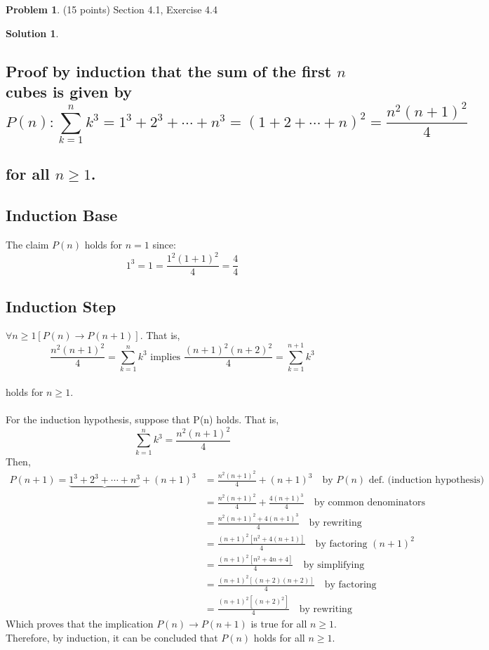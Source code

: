 \documentclass{article}
\theoremstyle{definition}
\newtheorem{problem}{Problem}
\newtheorem*{solution}{Solution}
\begin{document}
\newpage
\begin{problem} (15 points) Section 4.1, Exercise 4.4 
\end{problem}
\begin{solution}
\hspace{1cm}
\subsection*{Proof by induction that the sum of the first $n$ cubes is given by\\
$$P(n): \sum_{k=1}^{n} k^3 = 1^3 + 2^3 + \cdots + n^3 = (1+2+\cdots+n)^2 = \frac{n^2(n+1)^2}{4} $$\\ for all $n \geqslant 1$.}
\subsection*{Induction Base}
The claim $P(n)$ holds for $n = 1$ since:\\
$$1^3 = 1 = \frac{1^2(1+1)^2}{4} = \frac{4}{4}$$
\subsection*{Induction Step}
$\forall n \geqslant 1[P(n) \rightarrow P(n+1)]$. That is,\\
$$\frac{n^2(n+1)^2}{4} = \sum_{k=1}^{n} k^3 \mbox{ implies } \frac{(n+1)^2(n+2)^2}{4} = \sum_{k=1}^{n+1} k^3$$\\
holds for $n \geqslant 1$.\\\\
For the induction hypothesis, suppose that P(n) holds. That is,\\
$$\sum_{k=1}^{n} k^3 = \frac{n^2(n+1)^2}{4}$$ Then,
\begin{align*}
P(n+1) = \underbrace{1^3 + 2^3 + \cdots + n^3} + (n+1)^3 &= \frac{n^2(n+1)^2}{4} + (n+1)^3 \quad \mbox{by $P(n)$ def. (induction hypothesis)}\\ 
&= \frac{n^2(n+1)^2}{4} + \frac{4(n+1)^3}{4} \quad \mbox{by common denominators}\\
&= \frac{n^2(n+1)^2 + 4(n+1)^3}{4} \quad \mbox{by rewriting}\\
&= \frac{(n+1)^2[n^2+4(n+1)]}{4} \quad \mbox{by factoring $(n+1)^2$}\\
&= \frac{(n+1)^2[n^2+4n+4]}{4} \quad \mbox{by simplifying}\\
&= \frac{(n+1)^2[(n+2)(n+2)]}{4} \quad \mbox{by factoring}\\
&= \frac{(n+1)^2[(n+2)^2]}{4} \quad \mbox{by rewriting}
\end{align*}
Which proves that the implication $P(n) \rightarrow P(n+1)$ is true for all $n \geqslant 1$.
Therefore, by induction, it can be concluded that $P(n)$ holds for all $n \geqslant 1$.
\end{solution}
\end{document}
